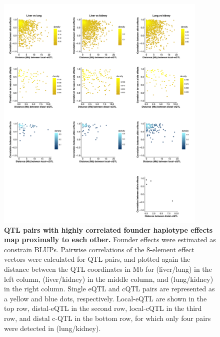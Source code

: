 \documentclass[9pt,twocolumn,twoside]{gsajnl}
\begin{document}
\begin{figure}[hp]
\renewcommand{\familydefault}{\sfdefault}\normalfont
\centering
\includegraphics[width=0.9\textwidth, trim={0in 0in 0in 0in}, clip]{figs/effect_size_cor_by_dist.pdf}
\caption{\textbf{QTL pairs with highly correlated founder haplotype effects map proximally to each other.} Founder effects were estimated as constrain BLUPs. Pairwise correlations of the 8-element effect vectors were calculated for QTL pairs, and plotted again the distance between the QTL coordinates in Mb for (liver/lung) in the left column, (liver/kidney) in the middle column, and (lung/kidney) in the right column. Single eQTL and cQTL pairs are represented as a yellow and blue dots, respectively. Local-eQTL are shown in the top row, distal-eQTL in the second row, local-cQTL in the third row, and distal c-QTL in the bottom row, for which only four pairs were detected in (lung/kidney).
\label{fig:qtl_cor_by_distance_comparison}}
\end{figure}

\clearpage
\end{document}
